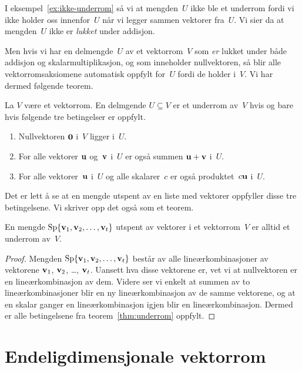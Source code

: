 I eksempel~\ref{ex:ikke-underrom} så vi at mengden~$U$ ikke ble et
underrom fordi vi ikke holder oss innenfor~$U$ når vi legger sammen
vektorer fra~$U$.  Vi sier da at mengden~$U$ ikke er \emph{lukket}
under addisjon.

Men hvis vi har en delmengde~$U$ av et vektorrom~$V$ som \emph{er}
lukket under både addisjon og skalarmultiplikasjon, og som inneholder
nullvektoren, så blir alle vektorromsaksiomene automatisk oppfylt
for~$U$ fordi de holder i~$V$.  Vi har dermed følgende teorem.

\begin{thm}
\label{thm:underrom}
La $V$ være et vektorrom.  En delmgende $U \subseteq V$ er et underrom
av~$V$ hvis og bare hvis følgende tre betingelser er oppfylt.
\begin{enumerate}
\item Nullvektoren $\mathbf{0}$ i~$V$ ligger i~$U$.
\item For alle vektorer $\mathbf{u}$ og~$\mathbf{v}$ i~$U$ er også summen
$\mathbf{u} + \mathbf{v}$ i~$U$.
\item For alle vektorer~$\mathbf{u}$ i~$U$ og alle skalarer~$c$ er også
produktet~$c\mathbf{u}$ i~$U$.
\end{enumerate}
\end{thm}

Det er lett å se at en mengde utspent av en liste med vektorer
oppfyller disse tre betingelsene.  Vi skriver opp det også som et
teorem.

\begin{thm}
\label{thm:underrom-sp}
En mengde $\operatorname{Sp} \{ \mathbf{v}_1, \mathbf{v}_2, \ldots, \mathbf{v}_t \}$ utspent av vektorer
i et vektorrom~$V$ er alltid et underrom av~$V$.
\end{thm}
\begin{proof}
Mengden $\operatorname{Sp} \{ \mathbf{v}_1, \mathbf{v}_2, \ldots, \mathbf{v}_t \}$ består av alle
lineærkombinasjoner av vektorene $\mathbf{v}_1$, $\mathbf{v}_2$, \ldots,
$\mathbf{v}_t$.  Uansett hva disse vektorene er, vet vi at nullvektoren er
en lineærkombinasjon av dem.  Videre ser vi enkelt at summen av to
lineærkombinasjoner blir en ny lineærkombinasjon av de samme
vektorene, og at en skalar ganger en lineærkombinasjon igjen blir en
lineærkombinasjon.  Dermed er alle betingelsene fra
teorem~\ref{thm:underrom} oppfylt.
\end{proof}



\section*{Endeligdimensjonale vektorrom}

